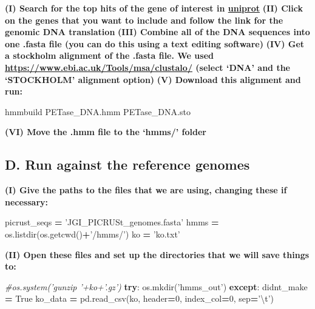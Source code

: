 \documentclass[
]{article}
\newenvironment{Shaded}{\begin{snugshade}}{\end{snugshade}}
\newcommand{\CharTok}[1]{\textcolor[rgb]{0.31,0.60,0.02}{#1}}
\newcommand{\CommentTok}[1]{\textcolor[rgb]{0.56,0.35,0.01}{\textit{#1}}}
\newcommand{\ControlFlowTok}[1]{\textcolor[rgb]{0.13,0.29,0.53}{\textbf{#1}}}
\newcommand{\DecValTok}[1]{\textcolor[rgb]{0.00,0.00,0.81}{#1}}
\newcommand{\ExtensionTok}[1]{#1}
\newcommand{\NormalTok}[1]{#1}
\newcommand{\OperatorTok}[1]{\textcolor[rgb]{0.81,0.36,0.00}{\textbf{#1}}}
\newcommand{\StringTok}[1]{\textcolor[rgb]{0.31,0.60,0.02}{#1}}
\newcommand{\VariableTok}[1]{\textcolor[rgb]{0.00,0.00,0.00}{#1}}
\begin{document}
\textbf{(I) Search for the top hits of the gene of interest in
\href{https://www.uniprot.org/}{uniprot}} \textbf{(II) Click on the
genes that you want to include and follow the link for the genomic DNA
translation} \textbf{(III) Combine all of the DNA sequences into one
.fasta file (you can do this using a text editing software)}
\textbf{(IV) Get a stockholm alignment of the .fasta file. We used
\url{https://www.ebi.ac.uk/Tools/msa/clustalo/} (select `DNA' and the
`STOCKHOLM' alignment option)} \textbf{(V) Download this alignment and
run: }

\begin{Shaded}
\begin{Highlighting}[]
\ExtensionTok{hmmbuild}\NormalTok{ PETase_DNA.hmm PETase_DNA.sto}
\end{Highlighting}
\end{Shaded}

\textbf{(VI) Move the .hmm file to the `hmms/' folder}

\hypertarget{d.-run-against-the-reference-genomes}{%
\subsection{D. Run against the reference
genomes}\label{d.-run-against-the-reference-genomes}}

\textbf{(I) Give the paths to the files that we are using, changing
these if necessary:}

\begin{Shaded}
\begin{Highlighting}[]
\NormalTok{picrust_seqs }\OperatorTok{=} \StringTok{'JGI_PICRUSt_genomes.fasta'}
\NormalTok{hmms }\OperatorTok{=}\NormalTok{ os.listdir(os.getcwd()}\OperatorTok{+}\StringTok{'/hmms/'}\NormalTok{)}
\NormalTok{ko }\OperatorTok{=} \StringTok{'ko.txt'}
\end{Highlighting}
\end{Shaded}

\textbf{(II) Open these files and set up the directories that we will
save things to:}

\begin{Shaded}
\begin{Highlighting}[]
\CommentTok{#os.system('gunzip '+ko+'.gz')}
\ControlFlowTok{try}\NormalTok{: os.mkdir(}\StringTok{'hmms_out'}\NormalTok{)}
\ControlFlowTok{except}\NormalTok{: didnt_make }\OperatorTok{=} \VariableTok{True}
\NormalTok{ko_data }\OperatorTok{=}\NormalTok{ pd.read_csv(ko, header}\OperatorTok{=}\DecValTok{0}\NormalTok{, index_col}\OperatorTok{=}\DecValTok{0}\NormalTok{, sep}\OperatorTok{=}\StringTok{'}\CharTok{\textbackslash{}t}\StringTok{'}\NormalTok{)}
\end{Highlighting}
\end{Shaded}
\end{document}
